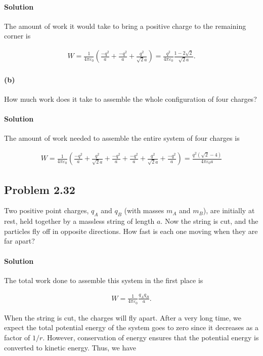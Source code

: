 \documentclass{article}
\begin{document}
\paragraph{Solution} The amount of work it would take to bring a positive charge to the remaining corner is 

\begin{align*}
    W = \frac{1}{4\pi\varepsilon_0}\left( \frac{-q^2}{a} + \frac{-q^2}{a} + \frac{q^2}{\sqrt{2}a} \right) = \frac{q^2}{4\pi\varepsilon_0}\frac{1-2\sqrt{2}}{\sqrt{2}a}.
\end{align*}

\paragraph{(b)} How much work does it take to assemble the whole configuration of four charges?

\paragraph{Solution} The amount of work needed to assemble the entire system of four charges is 

\begin{align*}
    W = \frac{1}{4\pi\varepsilon_0} \left( \frac{-q^2}{a} + \frac{q^2}{\sqrt{2}a}  + \frac{-q^2}{a} + \frac{-q^2}{a} + \frac{q^2}{\sqrt{2}a} + \frac{-q^2}{a} \right) = \frac{q^2 (\sqrt{2} - 4)}{4\pi\varepsilon_0 a}
\end{align*}

\newpage
\subsection*{Problem 2.32} Two positive point charges, \(q_A\) and \(q_B\) (with masses \(m_A\) and \(m_B\)), are initially at rest, held together by a massless string of length \(a\). Now the string is cut, and the particles fly off in opposite directions. How fast is each one moving when they are far apart?

\paragraph{Solution} The total work done to assemble this system in the first place is 

\begin{align*}
    W = \frac{1}{4\pi\varepsilon_0} \frac{q_Aq_B}{a}.
\end{align*}

When the string is cut, the charges will fly apart. After a very long time, we expect the total potential energy of the system goes to zero since it decreases as a factor of $1/r$. However, conservation of energy ensures that the potential energy is converted to kinetic energy. Thus, we have 
\end{document}
